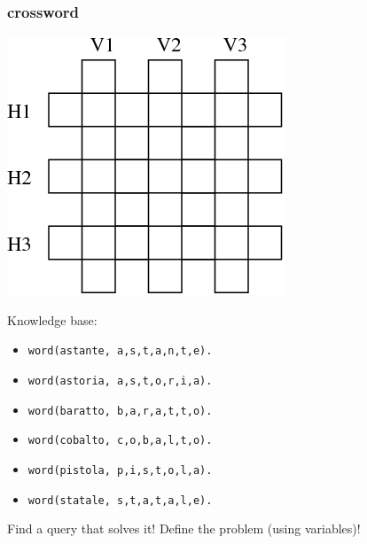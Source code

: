 \begin{frame}
\frametitle{crossword}
\begin{center}
    \includegraphics[scale=.3]{crossword.png}
\end{center}

Knowledge base:
\begin{itemize}
    \item \texttt{word(astante, a,s,t,a,n,t,e).}
    \item \texttt{word(astoria, a,s,t,o,r,i,a).}
    \item \texttt{word(baratto, b,a,r,a,t,t,o).}
    \item \texttt{word(cobalto, c,o,b,a,l,t,o).}
    \item \texttt{word(pistola, p,i,s,t,o,l,a).}
    \item \texttt{word(statale, s,t,a,t,a,l,e).}
\end{itemize}
Find a query that solves it! Define the problem (using variables)!


\end{frame}
